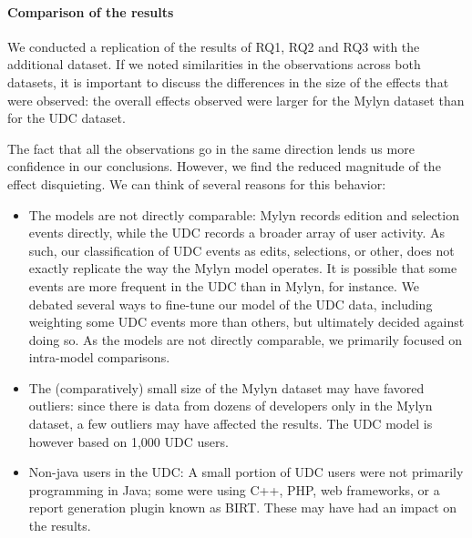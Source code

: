 \documentclass[times]{smrauth}
\begin{document}

\paragraph{Comparison of the results}

We conducted a replication of the results of RQ1, RQ2 and RQ3 with the additional dataset. If we noted similarities in the observations across both datasets, it is important to discuss the differences in the size of the effects that were observed: the overall effects observed were larger for the Mylyn dataset than for the UDC dataset.

The fact that all the observations go in the same direction lends us more confidence in our conclusions. However, we find the reduced magnitude of the effect disquieting. We can think of several reasons for this behavior:

\begin{itemize}
\item The models are not directly comparable: Mylyn records edition and selection events directly, while the UDC records a broader array of user activity. As such, our classification of UDC events as edits, selections, or other, does not exactly replicate the way the Mylyn model operates. It is possible that some events are more frequent in the UDC than in Mylyn, for instance. We debated several ways to fine-tune our model of the UDC data, including weighting some UDC events more than others, but ultimately decided against doing so. As the models are not directly comparable, we primarily focused on intra-model comparisons.
\item The (comparatively) small size of the Mylyn dataset may have favored outliers: since there is data from dozens of developers only in the Mylyn dataset, a few outliers may have affected the results. The UDC model is however based on 1,000 UDC users.
\item Non-java users in the UDC: A small portion of UDC users were not primarily programming in Java; some were using C++, PHP, web frameworks, or a report generation plugin known as BIRT. These may have had an impact on the results.
\end{itemize}
\end{document}
